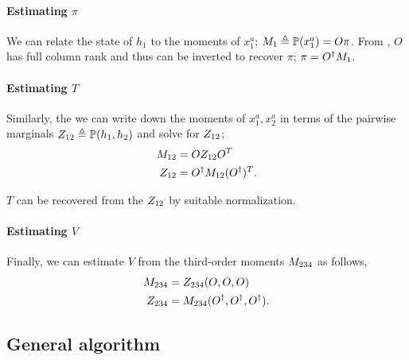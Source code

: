 
\paragraph{Estimating $\pi$}

We can relate the state of $h_1$ to the moments of $x^a_1$; $M_1
  \triangleq \mathbb{P}(x^a_1) = O \pi$. From , $O$ has full
  column rank and thus can be inverted to recover $\pi$; $\pi = {O}^{\dagger}
  M_1$.

\paragraph{Estimating $T$}

Similarly, the we can write down the moments of $x^a_1, x^a_2$ in terms
of the pairwise marginals $Z_{12} \triangleq \mathbb{P}(h_1, h_2)$ and solve for
$Z_{12}$;
\begin{align*}
  M_{12} &= O Z_{12} O^T \\
  Z_{12} &= {O}^{\dagger} M_{12} ({O}^{\dagger})^T.
\end{align*}

$T$ can be recovered from the $Z_{12}$ by suitable normalization.

\paragraph{Estimating $V$}

Finally, we can estimate $V$ from the third-order moments $M_{234}$ as
follows,
\begin{align*}
  M_{234} &= Z_{234}(O, O, O) \\
  Z_{234} &= M_{234}({O}^{\dagger}, {O}^{\dagger}, {O}^{\dagger}).
\end{align*}

\subsection{General algorithm}

